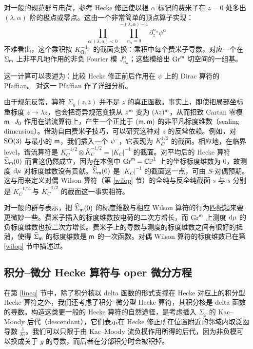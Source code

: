 对一般的规范群与电荷，参考 Hecke 修正使以根 $\alpha$ 标记的费米子在 $z=0$ 处多出 $(\lambda, \alpha)$ 阶的极点或零点。这由一个非常简单的顶点算子实现：
\begin{equation}\label{opspin}
\prod_{\alpha | (\lambda, \alpha)<0} \prod_{n_\alpha =0}^{-(\lambda, \alpha)-1}\partial_z^{n_{\alpha}}\psi^{\alpha}
\end{equation}
不难看出，这个乘积按 $K_{{\mathrm{Gr}}^{\sf m}}^{-1}$ 的截面变换：乘积中每个费米子导数，对应一个在 $\Sigma_{\sf m}$ 上非平凡地作用的非负 Fourier 模 $J_{n_\alpha}^\alpha$；这些模给出 ${\mathrm{Gr}}^{\sf m}$ 切空间的一组基。

这一计算可以表述为：比较 Hecke 修正前后作用在 $\psi$ 上的 Dirac 算符的 Pfaffian。\cite{BD} 对这一 Pfaffian 作了详细分析。

由于规范反常，算符 $\Sigma_{g}(z,\bar z)$ 并不是 $z$ 的真正函数。事实上，即使把局部坐标重标度 $z \to \lambda z$，也会把奇异规范变换从 $z^{\sf m}$ 变为 $(\lambda z)^{\sf m}$，从而招致 Cartan 零模 ${\sf m} \cdot J_0$ 作用在谱流算符上，产生一个正比于 $({\sf m},{\sf m})$ 的非平凡标度维数（scaling dimension）。借助自由费米子技巧，可以研究这种对 $z$ 的反常依赖。例如，对 ${\mathrm{SO}}(3)$ 与最小的 ${\sf m}$，我们插入一个 $\psi^-$，它表现为 $K_C^{1/2}$ 的截面。相应地，在临界 level，谱流算符是 $K_C^{-1/2}\otimes \bar K_C^{-1/2}=|K_C|^{-1}$ 的截面。对平均后的 Hecke 算符 $\widehat\Sigma_{\sf m}(0)$ 而言这仍然成立，因为在本例中 ${\mathrm{Gr}}^{\sf m}={\mathbb{CP}}^1$ 上的坐标标度维数为 $0$，故测度 ${\mathrm d} \mu$ 对标度维数没有贡献。$\widehat\Sigma_{\sf m}(0)$ 是 $|K_C|^{-1}$ 的截面这一点，可由 $S$-对偶预期。这与用来定义对偶 Wilson 算符（第 \ref{wilop} 节）的全纯与反全纯截面 $s$ 与 $\bar s$ 分别是 $K_C^{-1/2}$ 与 $\bar K_C^{-1/2}$ 的截面这一事实相符。

对一般的群与表示，把 $\widehat\Sigma_{\sf m}(0)$ 的标度维数与相应 Wilson 算符的行为匹配起来要更微妙一些。费米子插入的标度维数按电荷的二次方增长，而 ${\mathrm{Gr}}^{\sf m}$ 上测度 ${\mathrm d}\mu$ 的负标度维数也按二次方增长。费米子上的导数与测度的标度维数之间有很好的抵消，使得 $\widehat\Sigma_{\sf m}$ 的标度维数是 ${\sf m}$ 的一次函数。对偶 Wilson 算符的标度维数已在第 \ref{wilop} 节中描述过。





\subsection{积分–微分 Hecke 算符与 oper 微分方程}\label{opde}

在第 \ref{lineq} 节中，除了积分核以 delta 函数的形式支撑在 Hecke 对应上的积分型 Hecke 算符之外，我们还考虑了积分–微分型 Hecke 算符，其积分核是 delta 函数的导数。构造这类更一般的 Hecke 算符的自然途径，是考虑插入 $\Sigma_{g}$ 的 Kac--Moody 后代（descendant），它们表示在 Hecke 修正所在位置附近的邻域内取泛函导数 $\frac{\delta}{\delta a}$。我们可以只限于由 Kac--Moody 流负模作用所得的后代，因为非负模可以换成关于 $g$ 的导数，而后者在分部积分时会被积掉。

